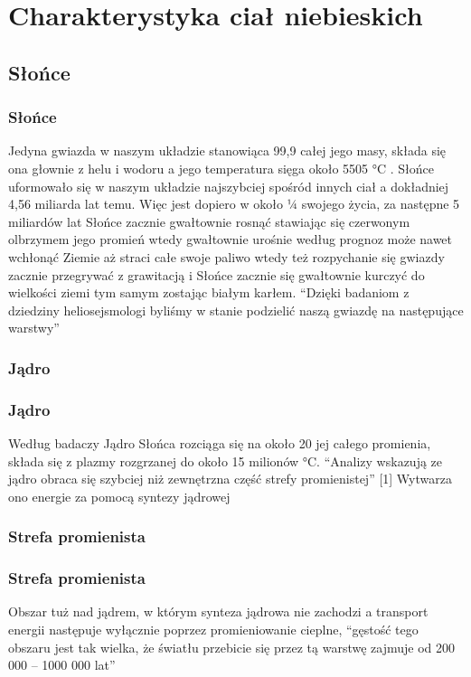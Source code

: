 \section{Charakterystyka ciał niebieskich}

\begin{frame}
\subsection{Słońce}
\frametitle{Słońce}
Jedyna gwiazda w naszym układzie stanowiąca 99,9 całej jego masy, składa się ona głownie z helu i wodoru a jego temperatura sięga około 5505 °C . Słońce uformowało się w naszym układzie najszybciej spośród innych ciał a dokładniej 4,56 miliarda lat temu. Więc jest dopiero w około ¼ swojego życia, za następne 5 miliardów lat Słońce zacznie gwałtownie rosnąć stawiając się czerwonym olbrzymem jego promień wtedy gwałtownie urośnie według prognoz może nawet wchłonąć Ziemie aż straci całe swoje paliwo wtedy też rozpychanie się gwiazdy zacznie przegrywać z grawitacją i Słońce zacznie się gwałtownie kurczyć do wielkości ziemi tym samym zostając białym karłem. “Dzięki badaniom z dziedziny heliosejsmologi byliśmy w stanie podzielić naszą gwiazdę na następujące warstwy”
\end{frame}

\begin{frame}
\frametitle{Jądro}
\subsubsection{Jądro}
Według badaczy Jądro Słońca rozciąga się na około 20 jej całego promienia, składa się z plazmy rozgrzanej do około 15 milionów °C. “Analizy wskazują ze jądro obraca się szybciej niż zewnętrzna część strefy promienistej” [1] Wytwarza ono energie za pomocą syntezy jądrowej 
\end{frame}

\begin{frame}
\frametitle{Strefa promienista}
\subsubsection{Strefa promienista}
Obszar tuż nad jądrem, w którym synteza jądrowa nie zachodzi a transport energii następuje wyłącznie poprzez promieniowanie cieplne, “gęstość tego obszaru jest tak wielka, że światłu przebicie się przez tą warstwę zajmuje od 200 000 – 1000 000 lat”
\end{frame}

